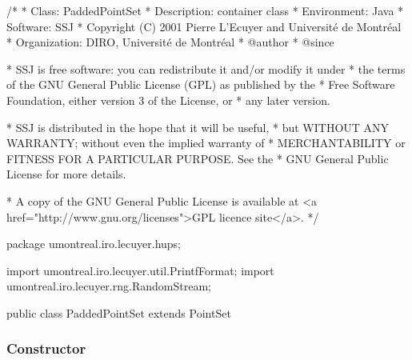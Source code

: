 \begin{code}\begin{hide}
/*
 * Class:        PaddedPointSet
 * Description:  container class
 * Environment:  Java
 * Software:     SSJ 
 * Copyright (C) 2001  Pierre L'Ecuyer and Université de Montréal
 * Organization: DIRO, Université de Montréal
 * @author       
 * @since

 * SSJ is free software: you can redistribute it and/or modify it under
 * the terms of the GNU General Public License (GPL) as published by the
 * Free Software Foundation, either version 3 of the License, or
 * any later version.

 * SSJ is distributed in the hope that it will be useful,
 * but WITHOUT ANY WARRANTY; without even the implied warranty of
 * MERCHANTABILITY or FITNESS FOR A PARTICULAR PURPOSE.  See the
 * GNU General Public License for more details.

 * A copy of the GNU General Public License is available at
   <a href="http://www.gnu.org/licenses">GPL licence site</a>.
 */
\end{hide}
package umontreal.iro.lecuyer.hups;\begin{hide}

import umontreal.iro.lecuyer.util.PrintfFormat;
import umontreal.iro.lecuyer.rng.RandomStream;\end{hide}
 
public class PaddedPointSet extends PointSet \begin{hide} {
   protected int curPointSets = 0;     // Current number of padded point sets.
   protected int maxPointSets;         // Max. number of padded point sets.
   protected PointSet pointSet[];      // List of padded point sets
   protected int startDim[];           // Starting dim. for padded points sets.
   protected int permutation[][];      // One permutation for each point set.

\end{hide}
\end{code}

\subsubsection*{Constructor}

